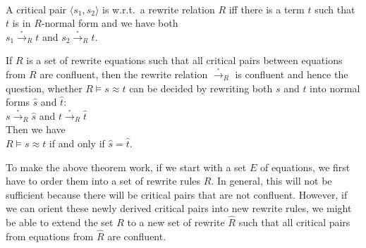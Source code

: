 \begin{Definition} \hspace*{\fill} \\
  A critical pair $\langle s_1, s_2\rangle$ is  w.r.t.~a rewrite relation $R$ iff there is a term
  $t$ such that $t$ is in $R$-normal form and we have both
  \\[0.2cm]
  \hspace*{1.3cm}
  $s_1 \stackrel{_*}{\rightarrow}_R t$ \quad and \quad   $s_2 \stackrel{_*}{\rightarrow}_R t$.  
\end{Definition}

\begin{Theorem}
  If $R$ is a set of rewrite equations such that all critical pairs between equations from $R$ are confluent,
  then the rewrite relation $\stackrel{_*}{\rightarrow}_R$ is confluent and hence the question, whether $R \models s \approx t$
  can be decided by rewriting both $s$ and $t$ into normal forms $\widehat{s}$ and $\widehat{t}$:
  \\[0.2cm]
  \hspace*{1.3cm}
  $s \stackrel{_*}{\rightarrow}_R \widehat{s}$ \quad and \quad  $t \stackrel{_*}{\rightarrow}_R \widehat{t}$ 
  \\[0.2cm]
  Then we have
  \\[0.2cm]
  \hspace*{1.3cm}
  $R \models s \approx t$ \quad if and only if \quad $\widehat{s} = \widehat{t}$.
\end{Theorem}

\noindent
To make the above theorem work, if we start with a set $E$ of equations, we first have to order them into a set
of rewrite rules $R$.  In general, this will not be sufficient because there will be critical pairs that are
not confluent. However, if we can orient these newly derived critical pairs into new rewrite rules, we might be
able to extend the set $R$ to a new set of rewrite $\widehat{R}$ such that all critical pairs from equations
from $\widehat{R}$ are confluent.
\vspace*{0.2cm}

